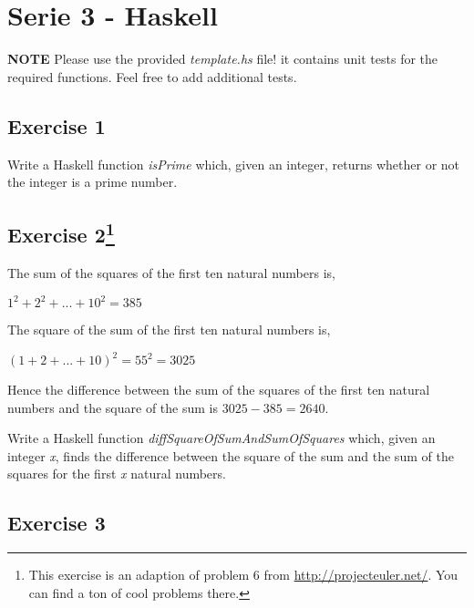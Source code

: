 \documentclass [11pt, a4wide, twoside]{article}
\begin{document}
\section*{Serie 3 - Haskell}

\textbf{NOTE} Please use the provided \emph{template.hs} file! it contains unit tests for the required functions. Feel free to add additional tests.
\subsection*{Exercise 1}

Write a Haskell function \emph{isPrime} which, given an integer, returns whether or 
not the integer is a prime number.


\subsection*{Exercise 2\footnote{This exercise is an adaption of problem 6 from \url{http://projecteuler.net/}. You can find a ton of cool problems there.}}

The sum of the squares of the first ten natural numbers is,

$1^2 + 2^2 + ... + 10^2 = 385$

The square of the sum of the first ten natural numbers is,

$(1 + 2 + ... + 10)^2 = 55^2 = 3025$

Hence the difference between the sum of the squares of the first ten natural numbers and the square of the sum is $3025 - 385 = 2640.$

Write a Haskell function \emph{diffSquareOfSumAndSumOfSquares} which, given an integer \emph{x}, finds the difference between the square of the sum and the sum of the squares for the first \emph{x} natural numbers.




\solution{}
\subsection*{Exercise 3}
\end{document}
